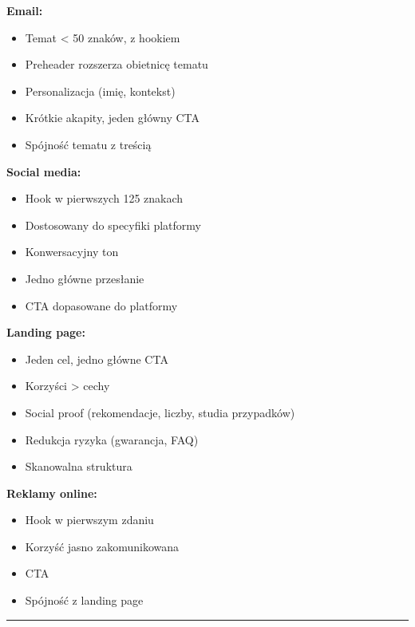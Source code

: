 \documentclass[
  12pt,
  a4paper,
  twoside,
  openright,
  12pt,
  DIV=12,
  BCOR=12mm]{scrbook}
\providecommand{\tightlist}{%
  \setlength{\itemsep}{0pt}\setlength{\parskip}{0pt}}\usepackage{longtable,booktabs,array}
\newcommand{\decoline}{%
  \begin{center}
    \textcolor{bordergray}{\rule{0.3\textwidth}{0.5pt}}
  \end{center}
}
\begin{document}
\textbf{Email:}

\begin{itemize}
\tightlist
\item[$\square$]
  Temat \textless{} 50 znaków, z hookiem
\item[$\square$]
  Preheader rozszerza obietnicę tematu
\item[$\square$]
  Personalizacja (imię, kontekst)
\item[$\square$]
  Krótkie akapity, jeden główny CTA
\item[$\square$]
  Spójność tematu z treścią
\end{itemize}

\textbf{Social media:}

\begin{itemize}
\tightlist
\item[$\square$]
  Hook w pierwszych 125 znakach
\item[$\square$]
  Dostosowany do specyfiki platformy
\item[$\square$]
  Konwersacyjny ton
\item[$\square$]
  Jedno główne przesłanie
\item[$\square$]
  CTA dopasowane do platformy
\end{itemize}

\textbf{Landing page:}

\begin{itemize}
\tightlist
\item[$\square$]
  Jeden cel, jedno główne CTA
\item[$\square$]
  Korzyści \textgreater{} cechy
\item[$\square$]
  Social proof (rekomendacje, liczby, studia przypadków)
\item[$\square$]
  Redukcja ryzyka (gwarancja, FAQ)
\item[$\square$]
  Skanowalna struktura
\end{itemize}

\textbf{Reklamy online:}

\begin{itemize}
\tightlist
\item[$\square$]
  Hook w pierwszym zdaniu
\item[$\square$]
  Korzyść jasno zakomunikowana
\item[$\square$]
  CTA
\item[$\square$]
  Spójność z landing page
\end{itemize}

\decoline
\end{document}
